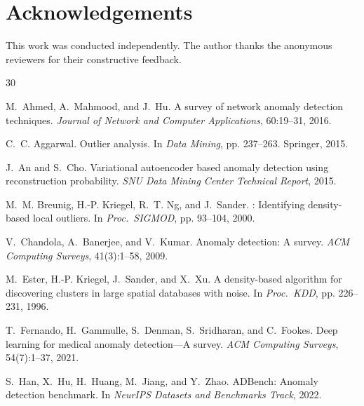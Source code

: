 \documentclass{article}
\begin{document}
\section*{Acknowledgements}
This work was conducted independently. The author thanks the anonymous reviewers for their constructive feedback.



\begin{thebibliography}{30}

M.~Ahmed, A.~Mahmood, and J.~Hu.
\newblock A survey of network anomaly detection techniques.
\newblock \emph{Journal of Network and Computer Applications}, 60:19--31, 2016.

C.~C. Aggarwal.
\newblock Outlier analysis.
\newblock In \emph{Data Mining}, pp. 237--263. Springer, 2015.

J.~An and S.~Cho.
\newblock Variational autoencoder based anomaly detection using reconstruction probability.
\newblock \emph{SNU Data Mining Center Technical Report}, 2015.

M.~M. Breunig, H.-P. Kriegel, R.~T. Ng, and J.~Sander.
: Identifying density-based local outliers.
\newblock In \emph{Proc.\ SIGMOD}, pp. 93--104, 2000.

V.~Chandola, A.~Banerjee, and V.~Kumar.
\newblock Anomaly detection: A survey.
\newblock \emph{ACM Computing Surveys}, 41(3):1--58, 2009.

M.~Ester, H.-P. Kriegel, J.~Sander, and X.~Xu.
\newblock A density-based algorithm for discovering clusters in large spatial databases with noise.
\newblock In \emph{Proc.\ KDD}, pp. 226--231, 1996.

T.~Fernando, H.~Gammulle, S.~Denman, S.~Sridharan, and C.~Fookes.
\newblock Deep learning for medical anomaly detection---A survey.
\newblock \emph{ACM Computing Surveys}, 54(7):1--37, 2021.

S.~Han, X.~Hu, H.~Huang, M.~Jiang, and Y.~Zhao.
\newblock ADBench: Anomaly detection benchmark.
\newblock In \emph{NeurIPS Datasets and Benchmarks Track}, 2022.


\end{thebibliography}
\end{document}
